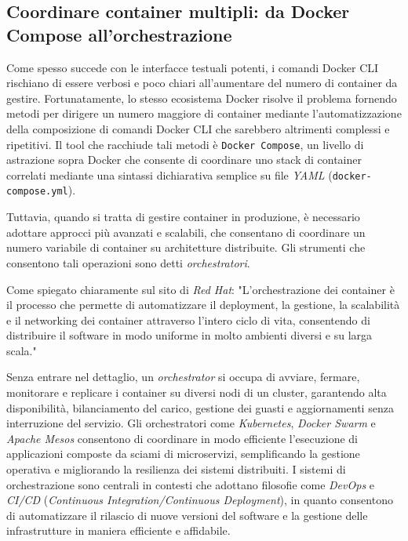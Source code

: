 \subsection{Coordinare container multipli: da Docker Compose all'orchestrazione}
Come spesso succede con le interfacce testuali potenti, i comandi Docker CLI rischiano di essere verbosi e poco chiari all'aumentare del numero di container da gestire. Fortunatamente, lo stesso ecosistema Docker risolve il problema fornendo metodi per dirigere un numero maggiore di container mediante l'automatizzazione della composizione di comandi Docker CLI che sarebbero altrimenti complessi e ripetitivi.
Il tool che racchiude tali metodi è \texttt{Docker Compose}, un livello di astrazione sopra Docker che consente di coordinare uno stack di container correlati mediante una sintassi dichiarativa semplice su file \emph{YAML} (\texttt{docker-compose.yml}).

Tuttavia, quando si tratta di gestire container in produzione, è necessario adottare approcci più avanzati e scalabili, che consentano di coordinare un numero variabile di container su architetture distribuite. Gli strumenti che consentono tali operazioni sono detti \emph{orchestratori}.

Come spiegato chiaramente sul sito di \emph{Red Hat}: "L'orchestrazione dei container è il processo che permette di automatizzare il deployment, la gestione, la scalabilità e il networking dei container attraverso l'intero ciclo di vita, consentendo di distribuire il software in modo uniforme in molto ambienti diversi e su larga scala." \cite{RedHat_Orchestration}

Senza entrare nel dettaglio, un \emph{orchestrator} si occupa di avviare, fermare, monitorare e replicare i container su diversi nodi di un cluster, garantendo alta disponibilità, bilanciamento del carico, gestione dei guasti e aggiornamenti senza interruzione del servizio. Gli orchestratori come \emph{Kubernetes}, \emph{Docker Swarm} e \emph{Apache Mesos} consentono di coordinare in modo efficiente l'esecuzione di applicazioni composte da sciami di microservizi, semplificando la gestione operativa e migliorando la resilienza dei sistemi distribuiti.
I sistemi di orchestrazione sono centrali in contesti che adottano filosofie come \emph{DevOps} e \emph{CI/CD} (\emph{Continuous Integration/Continuous Deployment}), in quanto consentono di automatizzare il rilascio di nuove versioni del software e la gestione delle infrastrutture in maniera efficiente e affidabile.

